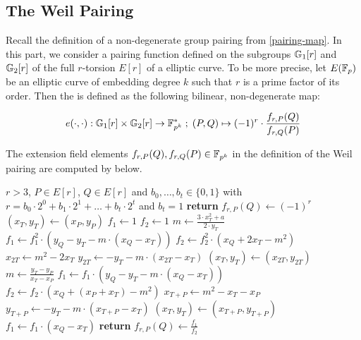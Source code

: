 \subsection{The Weil Pairing}
\label{sec:weil-pairing} Recall the definition of a non-degenerate group pairing from \ref{pairing-map}. In this part, we consider a pairing function defined on
the subgroups $\mathbb{G}_1[r]$ and $\mathbb{G}_2[r]$ of the full $r$-torsion $E[r]$ of a  elliptic curve. To be more precise, let $E(\mathbb{F}_p)$ be an elliptic curve of embedding degree $k$ such that $r$ is a prime factor of its order. Then the  is defined as the following bilinear, non-degenerate map:

\begin{equation}\label{eq:weil-pairing}
e(\cdot,\cdot) : \mathbb{G}_1[r] \times \mathbb{G}_2[r] \to \mathbb{F}^*_{p^k}\; ;\; 
(P,Q)\mapsto (-1)^r \cdot \frac{f_{r,P}(Q)}{f_{r,Q}(P)}
\end{equation} 

The extension field elements $f_{r,P}(Q), f_{r,Q}(P)\in \mathbb{F}_{p^k}$ in the definition of the Weil pairing are computed by  below.

\begin{algorithm}\caption{Miller's algorithm for  curves $y^2 = x^3 +ax +b$}\label{alg:millersalgo}
\begin{algorithmic}[0]
\Require $r>3$, $P \in E[r]$, $Q\in E[r]$ and
\State $b_0,\ldots, b_t\in \{0,1\}$ with $r= b_0\cdot 2^0 + b_1\cdot 2^1 + \ldots + b_t\cdot 2^t$ and $b_t=1$
	\State \textbf{return} $f_{r,P}(Q) \gets (-1)^r$
\EndIf
\State $(x_T,y_T) \gets (x_P,y_P)$
\State $f_1\gets 1$
\State $f_2\gets 1$
	\State $m \gets \frac{3\cdot x_T^2+a}{2\cdot y_T}$	
    \State $f_1 \gets f_1^2\cdot (y_Q - y_T - m\cdot(x_Q-x_T))$
	\State $f_2 \gets f_2^2\cdot (x_Q + 2x_T -m^2)$
	\State $x_{2T} \gets m^2 - 2 x_T$
	\State $y_{2T} \gets -y_T - m\cdot (x_{2T}-x_T)$
	\State $(x_T,y_T)\gets (x_{2T},y_{2T})$ 
		\State $m \gets \frac{y_T -y_P}{x_T - x_P}$
		\State $f_1 \gets f_1\cdot (y_Q -y_T -m\cdot (x_Q - x_T))$
		\State $f_2 \gets f_2\cdot (x_Q + (x_P+x_T) - m^2)$
		\State $x_{T+P} \gets m^2 -x_T -x_P$
		\State $y_{T+P}\gets -y_T - m\cdot (x_{T+P}-x_T)$
		\State $(x_T,y_T)\gets (x_{T+P},y_{T+P})$
	\EndIf
\EndFor
\State $f_1 \gets f_1\cdot (x_Q - x_T)$
\State \textbf{return} $f_{r,P}(Q) \gets \frac{f_1}{f_2}$
\EndProcedure
\end{algorithmic}
\end{algorithm}

